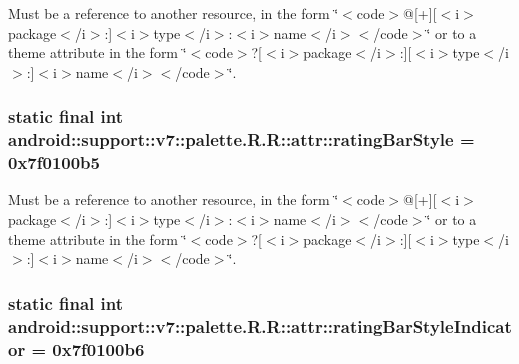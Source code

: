 Must be a reference to another resource, in the form \char`\"{}$<$code$>$@\mbox{[}+\mbox{]}\mbox{[}$<$i$>$package$<$/i$>$:\mbox{]}$<$i$>$type$<$/i$>$:$<$i$>$name$<$/i$>$$<$/code$>$\char`\"{} or to a theme attribute in the form \char`\"{}$<$code$>$?\mbox{[}$<$i$>$package$<$/i$>$:\mbox{]}\mbox{[}$<$i$>$type$<$/i$>$:\mbox{]}$<$i$>$name$<$/i$>$$<$/code$>$\char`\"{}. \hypertarget{classandroid_1_1support_1_1v7_1_1palette_1_1_r_1_1attr_67540336c711eb571908be2161faf648}{
\subsubsection[{ratingBarStyle}]{\setlength{\rightskip}{0pt plus 5cm}static final int android::support::v7::palette.R.R::attr::ratingBarStyle = 0x7f0100b5}}
\label{classandroid_1_1support_1_1v7_1_1palette_1_1_r_1_1attr_67540336c711eb571908be2161faf648}


Must be a reference to another resource, in the form \char`\"{}$<$code$>$@\mbox{[}+\mbox{]}\mbox{[}$<$i$>$package$<$/i$>$:\mbox{]}$<$i$>$type$<$/i$>$:$<$i$>$name$<$/i$>$$<$/code$>$\char`\"{} or to a theme attribute in the form \char`\"{}$<$code$>$?\mbox{[}$<$i$>$package$<$/i$>$:\mbox{]}\mbox{[}$<$i$>$type$<$/i$>$:\mbox{]}$<$i$>$name$<$/i$>$$<$/code$>$\char`\"{}. \hypertarget{classandroid_1_1support_1_1v7_1_1palette_1_1_r_1_1attr_6a7f21ba3a54640088627e269bda4e99}{
\subsubsection[{ratingBarStyleIndicator}]{\setlength{\rightskip}{0pt plus 5cm}static final int android::support::v7::palette.R.R::attr::ratingBarStyleIndicator = 0x7f0100b6}}
\label{classandroid_1_1support_1_1v7_1_1palette_1_1_r_1_1attr_6a7f21ba3a54640088627e269bda4e99}



